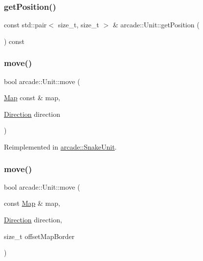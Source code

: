\subsubsection{\texorpdfstring{get\+Position()}{getPosition()}}
{\footnotesize\ttfamily const std\+::pair$<$ size\+\_\+t, size\+\_\+t $>$ \& arcade\+::\+Unit\+::get\+Position (\begin{DoxyParamCaption}{ }\end{DoxyParamCaption}) const}

\mbox{\label{classarcade_1_1_unit_a2a6a6feacea0fce220062be1115207b1}} 
\subsubsection{\texorpdfstring{move()}{move()}\hspace{0.1cm}{\footnotesize\ttfamily [1/2]}}
{\footnotesize\ttfamily bool arcade\+::\+Unit\+::move (\begin{DoxyParamCaption}\item[{\hyperlink{classarcade_1_1_map}{Map} const \&}]{map,  }\item[{\hyperlink{classarcade_1_1_unit_af418afeaba1f7fd5934b6ae1343215dd}{Direction}}]{direction }\end{DoxyParamCaption})\hspace{0.3cm}{\ttfamily [virtual]}}



Reimplemented in \hyperlink{classarcade_1_1_snake_unit_ac291cd07b71f42589e29157fdcf52416}{arcade\+::\+Snake\+Unit}.

\mbox{\label{classarcade_1_1_unit_a4a108f0a801a245f048366f787dcbe15}} 
\subsubsection{\texorpdfstring{move()}{move()}\hspace{0.1cm}{\footnotesize\ttfamily [2/2]}}
{\footnotesize\ttfamily bool arcade\+::\+Unit\+::move (\begin{DoxyParamCaption}\item[{const \hyperlink{classarcade_1_1_map}{Map} \&}]{map,  }\item[{\hyperlink{classarcade_1_1_unit_af418afeaba1f7fd5934b6ae1343215dd}{Direction}}]{direction,  }\item[{size\+\_\+t}]{offset\+Map\+Border }\end{DoxyParamCaption})}


